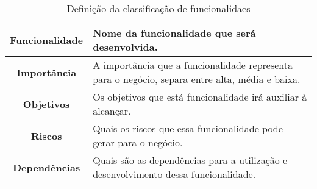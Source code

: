     \begin{table}[h!]
      \centering
      \begin{tabular}{|c|p{10cm}|}
        \hline
        \textbf{Funcionalidade} &
        Nome da funcionalidade que será desenvolvida. \\ \hline
        \textbf{Importância} &
        A importância que a funcionalidade representa para o negócio, separa entre
        alta, média e baixa. \\ \hline
        \textbf{Objetivos} &
        Os objetivos que está funcionalidade irá auxiliar à alcançar. \\ \hline
        \textbf{Riscos} &
        Quais os riscos que essa funcionalidade pode gerar para o negócio. \\ \hline
        \textbf{Dependências} &
        Quais são as dependências para a utilização e desenvolvimento dessa
        funcionalidade. \\ \hline
      \end{tabular}
      \caption{Definição da classificação de funcionalidaes}
      \label{Tabela:1}
    \end{table}

